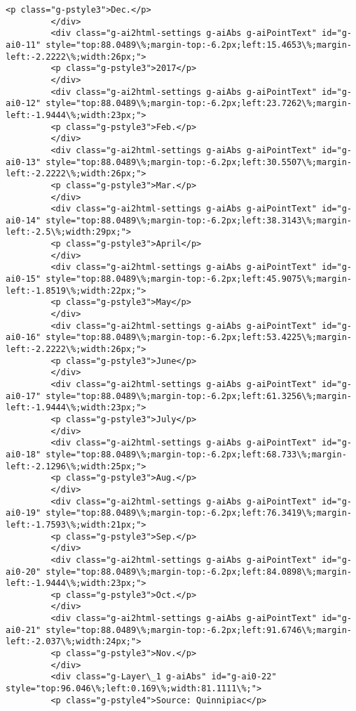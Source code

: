 \documentclass[11pt]{article}
\begin{document}
\begin{Verbatim}[commandchars=\\\{\}]
         <p class="g-pstyle3">Dec.</p>
         </div>
         <div class="g-ai2html-settings g-aiAbs g-aiPointText" id="g-ai0-11" style="top:88.0489\%;margin-top:-6.2px;left:15.4653\%;margin-left:-2.2222\%;width:26px;">
         <p class="g-pstyle3">2017</p>
         </div>
         <div class="g-ai2html-settings g-aiAbs g-aiPointText" id="g-ai0-12" style="top:88.0489\%;margin-top:-6.2px;left:23.7262\%;margin-left:-1.9444\%;width:23px;">
         <p class="g-pstyle3">Feb.</p>
         </div>
         <div class="g-ai2html-settings g-aiAbs g-aiPointText" id="g-ai0-13" style="top:88.0489\%;margin-top:-6.2px;left:30.5507\%;margin-left:-2.2222\%;width:26px;">
         <p class="g-pstyle3">Mar.</p>
         </div>
         <div class="g-ai2html-settings g-aiAbs g-aiPointText" id="g-ai0-14" style="top:88.0489\%;margin-top:-6.2px;left:38.3143\%;margin-left:-2.5\%;width:29px;">
         <p class="g-pstyle3">April</p>
         </div>
         <div class="g-ai2html-settings g-aiAbs g-aiPointText" id="g-ai0-15" style="top:88.0489\%;margin-top:-6.2px;left:45.9075\%;margin-left:-1.8519\%;width:22px;">
         <p class="g-pstyle3">May</p>
         </div>
         <div class="g-ai2html-settings g-aiAbs g-aiPointText" id="g-ai0-16" style="top:88.0489\%;margin-top:-6.2px;left:53.4225\%;margin-left:-2.2222\%;width:26px;">
         <p class="g-pstyle3">June</p>
         </div>
         <div class="g-ai2html-settings g-aiAbs g-aiPointText" id="g-ai0-17" style="top:88.0489\%;margin-top:-6.2px;left:61.3256\%;margin-left:-1.9444\%;width:23px;">
         <p class="g-pstyle3">July</p>
         </div>
         <div class="g-ai2html-settings g-aiAbs g-aiPointText" id="g-ai0-18" style="top:88.0489\%;margin-top:-6.2px;left:68.733\%;margin-left:-2.1296\%;width:25px;">
         <p class="g-pstyle3">Aug.</p>
         </div>
         <div class="g-ai2html-settings g-aiAbs g-aiPointText" id="g-ai0-19" style="top:88.0489\%;margin-top:-6.2px;left:76.3419\%;margin-left:-1.7593\%;width:21px;">
         <p class="g-pstyle3">Sep.</p>
         </div>
         <div class="g-ai2html-settings g-aiAbs g-aiPointText" id="g-ai0-20" style="top:88.0489\%;margin-top:-6.2px;left:84.0898\%;margin-left:-1.9444\%;width:23px;">
         <p class="g-pstyle3">Oct.</p>
         </div>
         <div class="g-ai2html-settings g-aiAbs g-aiPointText" id="g-ai0-21" style="top:88.0489\%;margin-top:-6.2px;left:91.6746\%;margin-left:-2.037\%;width:24px;">
         <p class="g-pstyle3">Nov.</p>
         </div>
         <div class="g-Layer\_1 g-aiAbs" id="g-ai0-22" style="top:96.046\%;left:0.169\%;width:81.1111\%;">
         <p class="g-pstyle4">Source: Quinnipiac</p>

\end{Verbatim}
\end{document}
